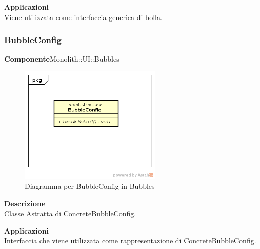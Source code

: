 \textbf{Applicazioni}\\
Viene utilizzata come interfaccia generica di bolla. 


\clearpage

\subsubsection{BubbleConfig}
\textbf{Componente}Monolith::UI::Bubbles\\
   \FloatBarrier
   \begin{figure}[ht]
   \centering
   \includegraphics[width=0.6\textwidth]{img/single-BubbleConfig}
   \caption{{Diagramma per BubbleConfig in Bubbles}}
\end{figure}
\FloatBarrier
\textbf{Descrizione}\\
Classe Astratta di ConcreteBubbleConfig. 


\textbf{Applicazioni}\\
Interfaccia che viene utilizzata come rappresentazione di ConcreteBubbleConfig. 


\clearpage

